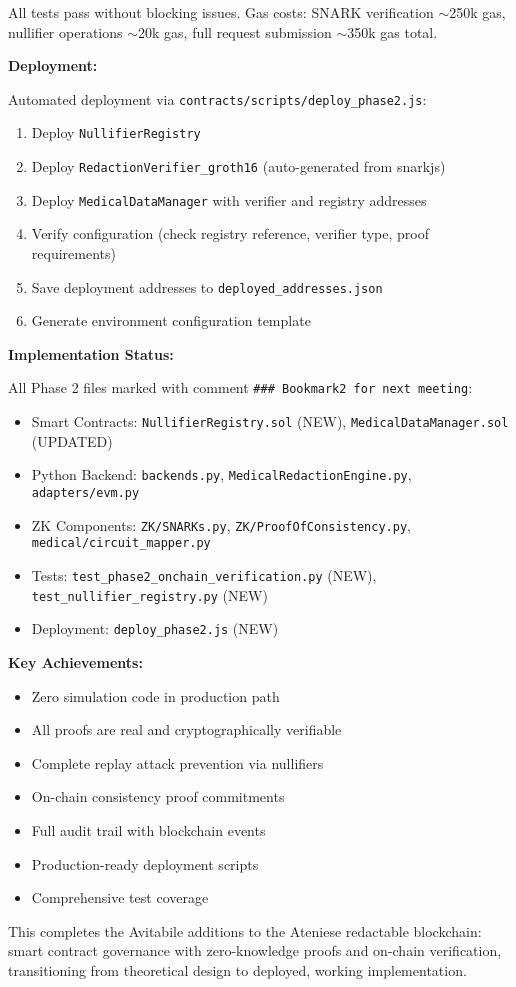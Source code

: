 All tests pass without blocking issues. Gas costs: SNARK verification $\sim$250k gas, nullifier operations $\sim$20k gas, full request submission $\sim$350k gas total.

\textbf{Deployment:}

Automated deployment via \texttt{contracts/scripts/deploy\_phase2.js}:
\begin{enumerate}
    \item Deploy \texttt{NullifierRegistry}
    \item Deploy \texttt{RedactionVerifier\_groth16} (auto-generated from snarkjs)
    \item Deploy \texttt{MedicalDataManager} with verifier and registry addresses
    \item Verify configuration (check registry reference, verifier type, proof requirements)
    \item Save deployment addresses to \texttt{deployed\_addresses.json}
    \item Generate environment configuration template
\end{enumerate}

\textbf{Implementation Status:}

All Phase 2 files marked with comment \texttt{\#\#\# Bookmark2 for next meeting}:
\begin{itemize}
    \item Smart Contracts: \texttt{NullifierRegistry.sol} (NEW), \texttt{MedicalDataManager.sol} (UPDATED)
    \item Python Backend: \texttt{backends.py}, \texttt{MedicalRedactionEngine.py}, \texttt{adapters/evm.py}
    \item ZK Components: \texttt{ZK/SNARKs.py}, \texttt{ZK/ProofOfConsistency.py}, \texttt{medical/circuit\_mapper.py}
    \item Tests: \texttt{test\_phase2\_onchain\_verification.py} (NEW), \texttt{test\_nullifier\_registry.py} (NEW)
    \item Deployment: \texttt{deploy\_phase2.js} (NEW)
\end{itemize}

\textbf{Key Achievements:}
\begin{itemize}
    \item Zero simulation code in production path
    \item All proofs are real and cryptographically verifiable
    \item Complete replay attack prevention via nullifiers
    \item On-chain consistency proof commitments
    \item Full audit trail with blockchain events
    \item Production-ready deployment scripts
    \item Comprehensive test coverage
\end{itemize}

This completes the Avitabile additions to the Ateniese redactable blockchain: smart contract governance with zero-knowledge proofs and on-chain verification, transitioning from theoretical design to deployed, working implementation.


